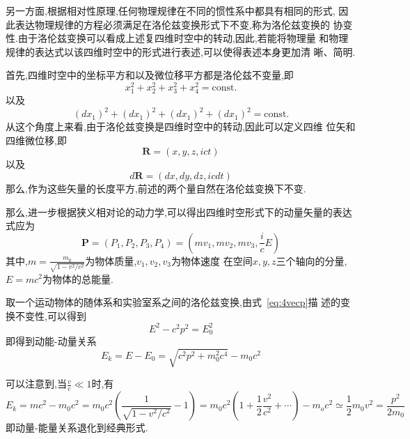 \documentclass[aps,pre,12pt,preprint,onecolumn,showpacs,showkeys]{revtex4-1}
\begin{document}
另一方面,根据相对性原理,任何物理规律在不同的惯性系中都具有相同的形式,
因此表达物理规律的方程必须满足在洛伦兹变换形式下不变,称为洛伦兹变换的
协变性.由于洛伦兹变换可以看成上述复四维时空中的转动,因此,若能将物理量
和物理规律的表达式以该四维时空中的形式进行表述,可以使得表述本身更加清
晰、简明.

首先,四维时空中的坐标平方和以及微位移平方都是洛伦兹不变量,即
\begin{equation}
  \label{eq:const1}
  x_1^2 + x_2^2 + x_3^2 + x_4^2 = \text{const.}
\end{equation}
以及
\begin{equation}
  \label{eq:const2}
  (dx_1)^2 + (dx_1)^2 + (dx_1)^2 + (dx_1)^2 = \text{const.}
\end{equation}
从这个角度上来看,由于洛伦兹变换是四维时空中的转动,因此可以定义四维
位矢和四维微位移,即
\begin{equation}
  \label{eq:4vecr}
  \bm{R} = (x,y,z,ict)
\end{equation}
以及
\begin{equation}
  \label{eq:4vecdr}
  d\bm{R} = (dx,dy,dz,icdt)
\end{equation}
那么,作为这些矢量的长度平方,前述的两个量自然在洛伦兹变换下不变.

那么,进一步根据狭义相对论的动力学,可以得出四维时空形式下的动量矢量的表达
式应为
\begin{equation}
  \label{eq:4vecp}
  \bm{P} = (P_1, P_2, P_3, P_4) =  (mv_1,mv_2,mv_3, \frac{i}{c}E)
\end{equation}
其中,$m = \frac{m_0}{\sqrt{1-v^2/c^2}}$为物体质量,$v_1,v_2,v_3$为物体速度
在空间$x,y,z$三个轴向的分量,$E=mc^2$为物体的总能量.


取一个运动物体的随体系和实验室系之间的洛伦兹变换,由式~\ref{eq:4vecp}描
述的变换不变性,可以得到
\begin{equation}
  \label{eq:E-P}
  E^2 - c^2p^2 = E_0^2
\end{equation}
即得到动能-动量关系
\begin{equation}
  \label{eq:Ek-P}
  E_k = E - E_0 = \sqrt{c^2p^2 + m_0^2c^4} - m_0c^2
\end{equation}

可以注意到,当$\frac{v}{c} \ll 1$时,有
\begin{equation}
  \label{eq:classical}
  E_k = mc^2 - m_0c^2 = m_0c^2(\frac{1}{\sqrt{1-v^2/c^2}} - 1) =
  m_0c^2(1 + \frac{1}{2}\frac{v^2}{c^2} + \cdots) - m_oc^2 \simeq
  \frac{1}{2}m_0v^2 = \frac{p^2}{2m_0}
\end{equation}
即动量-能量关系退化到经典形式.
\end{document}
